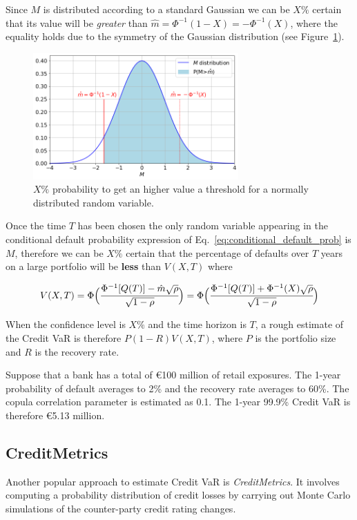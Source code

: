 Since $M$ is distributed according to a standard Gaussian we can be $X\%$ certain that its value will be \emph{greater} than $\hat{m} = \Phi^{-1}(1-X)=-\Phi^{-1}(X)$, where the equality holds due to the symmetry of the Gaussian distribution (see Figure~\ref{fig:certain_for_X}).

\begin{figure}[htb]
\centering
\includegraphics[width=0.7\textwidth]{figures/certain_for_X}
\caption{$X\%$ probability to get an higher value a threshold for a normally distributed random variable.}
\label{fig:certain_for_X}
\end{figure} 

Once the time $T$ has been chosen the only random variable appearing in the conditional default probability expression of Eq.~\ref{eq:conditional_default_prob} is $M$, therefore we can be $X\%$ certain that the percentage of defaults over $T$ years on a large portfolio will be \textbf{less} than $V(X,T)$ where

\begin{equation*}
V(X,T)= \Phi\Big(\cfrac{\Phi^{-1}[Q(T)]-\hat{m}\sqrt{\rho}}{\sqrt{1-\rho}}\Big) = \Phi\Big(\cfrac{\Phi^{-1}[Q(T)]+\Phi^{-1}(X)\sqrt{\rho}}{\sqrt{1-\rho}}\Big)
\end{equation*}

When the confidence level is $X\%$ and the time horizon is $T$, a rough estimate of the Credit VaR is therefore $P(1-R)V(X,T)$, where $P$ is the portfolio size and $R$ is the recovery rate.

Suppose that a bank has a total of \euro{100} million of retail exposures. The 1-year probability of default averages to 2\% and the recovery rate averages to 60\%. The copula correlation parameter is estimated as 0.1.
The 1-year 99.9\% Credit VaR is therefore \euro{5.13} million.

\subsection{CreditMetrics}
Another popular approach to estimate Credit VaR is \emph{CreditMetrics}. It involves computing a probability distribution of credit losses by carrying out Monte Carlo simulations of the counter-party credit rating changes.

